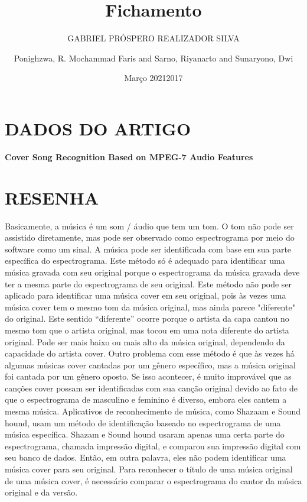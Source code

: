 \documentclass{article}
\title{Fichamento}
\author{GABRIEL PRÓSPERO REALIZADOR  SILVA}
\date{Março 2021}
\begin{document}
\maketitle

\section{DADOS DO ARTIGO}
\textbf{Cover Song Recognition Based on MPEG-7 Audio Features \\}
\author{Ponighzwa, R. Mochammad Faris and Sarno, Riyanarto and Sunaryono, Dwi \\}
\date{2017}

\section{RESENHA}
Basicamente, a música é um som / áudio que tem um tom. O tom não pode ser assistido diretamente, mas pode ser observado como espectrograma por meio do software como um sinal. 
A música pode ser identificada com base em sua parte específica do espectrograma. Este método só é adequado para identificar uma música gravada com seu original porque o espectrograma da música gravada deve ter a mesma parte do espectrograma de seu original. 
Este método não pode ser aplicado para identificar uma música cover em seu original, pois às vezes uma música cover tem o mesmo tom da música original, mas ainda parece "diferente" do original. 
Este sentido “diferente” ocorre porque o artista da capa cantou no mesmo tom que o artista original, mas tocou em uma nota diferente do artista original. Pode ser mais baixo ou mais alto da música original, dependendo da capacidade do artista cover. 
Outro problema com esse método é que às vezes há algumas músicas cover cantadas por um gênero específico, mas a música original foi cantada por um gênero oposto. 
Se isso acontecer, é muito improvável que as canções cover possam ser identificadas com sua canção original devido ao fato de que o espectrograma de masculino e feminino é diverso, embora eles cantem a mesma música. 
Aplicativos de reconhecimento de música, como Shazaam e Sound hound, usam um método de identificação baseado no espectrograma de uma música específica. 
Shazam e Sound hound usaram apenas uma certa parte do espectrograma, chamada impressão digital, e comparou sua impressão digital com seu banco de dados. 
Então, em outra palavra, eles não podem identificar uma música cover para seu original.
Para reconhecer o título de uma música original de uma música cover, é necessário comparar o espectrograma do cantor da música original e da versão. 
\end{document}
